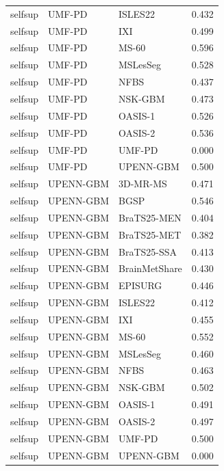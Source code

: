 \begin{tabular}{lllr}
selfsup & UMF-PD & ISLES22 & 0.432 \\
selfsup & UMF-PD & IXI & 0.499 \\
selfsup & UMF-PD & MS-60 & 0.596 \\
selfsup & UMF-PD & MSLesSeg & 0.528 \\
selfsup & UMF-PD & NFBS & 0.437 \\
selfsup & UMF-PD & NSK-GBM & 0.473 \\
selfsup & UMF-PD & OASIS-1 & 0.526 \\
selfsup & UMF-PD & OASIS-2 & 0.536 \\
selfsup & UMF-PD & UMF-PD & 0.000 \\
selfsup & UMF-PD & UPENN-GBM & 0.500 \\
selfsup & UPENN-GBM & 3D-MR-MS & 0.471 \\
selfsup & UPENN-GBM & BGSP & 0.546 \\
selfsup & UPENN-GBM & BraTS25-MEN & 0.404 \\
selfsup & UPENN-GBM & BraTS25-MET & 0.382 \\
selfsup & UPENN-GBM & BraTS25-SSA & 0.413 \\
selfsup & UPENN-GBM & BrainMetShare & 0.430 \\
selfsup & UPENN-GBM & EPISURG & 0.446 \\
selfsup & UPENN-GBM & ISLES22 & 0.412 \\
selfsup & UPENN-GBM & IXI & 0.455 \\
selfsup & UPENN-GBM & MS-60 & 0.552 \\
selfsup & UPENN-GBM & MSLesSeg & 0.460 \\
selfsup & UPENN-GBM & NFBS & 0.463 \\
selfsup & UPENN-GBM & NSK-GBM & 0.502 \\
selfsup & UPENN-GBM & OASIS-1 & 0.491 \\
selfsup & UPENN-GBM & OASIS-2 & 0.497 \\
selfsup & UPENN-GBM & UMF-PD & 0.500 \\
selfsup & UPENN-GBM & UPENN-GBM & 0.000 \\
\bottomrule
\end{tabular}
